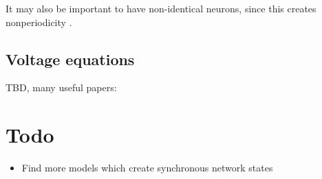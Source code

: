 \documentclass[a4paper, 12pt]{article}
\begin{document}
It may also be important to have non-identical neurons, since this creates nonperiodicity \cite{heterogeneousnetwork}.

\subsection*{Voltage equations}
TBD, many useful papers: \cite{objectworkingmemory, rubinov, kinouchi, larremorerestrepo, entropyinhibition, dynamicsynapses, biologicalsoc, heterogeneousnetwork}

\section*{Todo}
\begin{itemize}
\item Find more models which create synchronous network states
\end{itemize}



\end{document}

